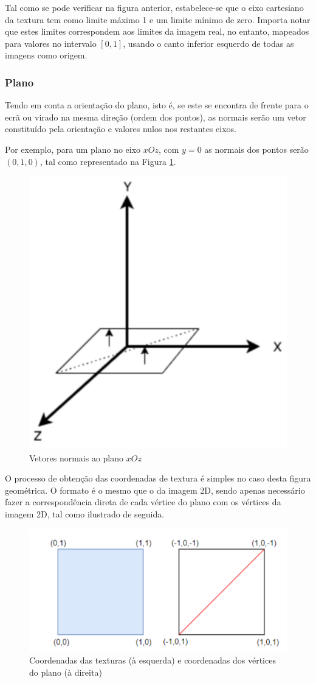 \documentclass[a4paper, 11pt]{article}
\begin{document}
Tal como se pode verificar na figura anterior, estabelece-se que o eixo cartesiano da textura tem 
como limite máximo 1 e um limite mínimo de zero. Importa notar que estes limites correspondem aos 
limites da imagem real, no entanto, mapeados para valores no intervalo $\left[ 0, 1 \right]$, 
usando o canto inferior esquerdo de todas as imagens como origem.

\subsubsection{Plano}

Tendo em conta a orientação do plano, isto é, se este se encontra de frente para o ecrã ou 
virado na mesma direção (ordem dos pontos), as normais serão um vetor constituído pela 
orientação e valores nulos nos restantes eixos. 

Por exemplo, para um plano no eixo $xOz$, com $y = 0$ as normais dos pontos serão $(0, 1, 0)$, tal 
como representado na Figura \ref{fig:plane}.

\begin{figure}[H]
    \centering
    \includegraphics[width=.3\textwidth]{img/xoz.png}
    \caption{Vetores normais ao plano $xOz$}
    \label{fig:plane}
\end{figure}

O processo de obtenção das coordenadas de textura é simples no caso desta figura geométrica. O 
formato é o mesmo que o da imagem 2D, sendo apenas necessário fazer a correspondência direta de 
cada vértice do plano com os vértices da imagem 2D, tal como ilustrado de seguida.

\begin{figure}[H]
    \centering
    \includegraphics[width=.5\textwidth]{img/text_plane.png}
    \caption{Coordenadas das texturas (à esquerda) e coordenadas dos vértices do plano (à 
direita)}
\end{figure}
\end{document}
